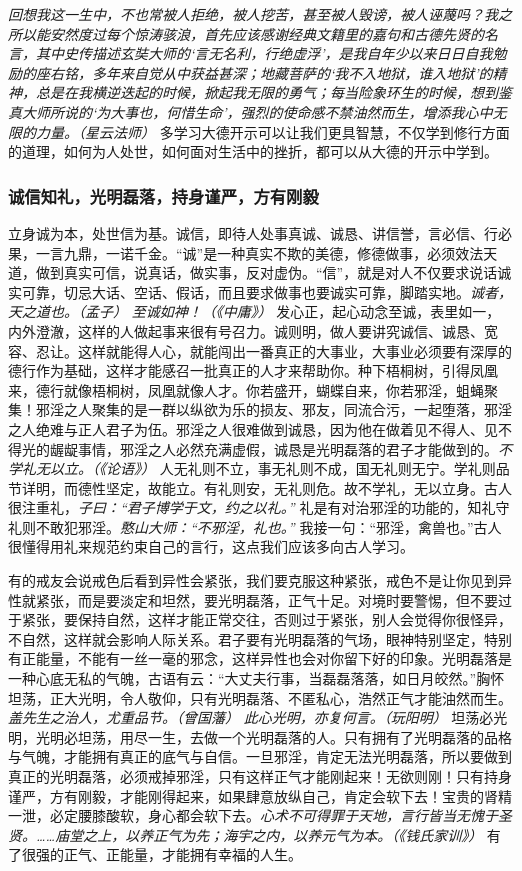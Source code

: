\textit{回想我这一生中，不也常被人拒绝，被人挖苦，甚至被人毁谤，被人诬蔑吗？我之所以能安然度过每个惊涛骇浪，首先应该感谢经典文籍里的嘉句和古德先贤的名言，其中史传描述玄奘大师的‘言无名利，行绝虚浮’，是我自年少以来日日自我勉励的座右铭，多年来自觉从中获益甚深；地藏菩萨的‘我不入地狱，谁入地狱’的精神，总是在我横逆迭起的时候，掀起我无限的勇气；每当险象环生的时候，想到鉴真大师所说的‘为大事也，何惜生命’，强烈的使命感不禁油然而生，增添我心中无限的力量。（星云法师）} 多学习大德开示可以让我们更具智慧，不仅学到修行方面的道理，如何为人处世，如何面对生活中的挫折，都可以从大德的开示中学到。

\subsubsection{诚信知礼，光明磊落，持身谨严，方有刚毅}

立身诚为本，处世信为基。诚信，即待人处事真诚、诚恳、讲信誉，言必信、行必果，一言九鼎，一诺千金。“诚”是一种真实不欺的美德，修德做事，必须效法天道，做到真实可信，说真话，做实事，反对虚伪。“信”，就是对人不仅要求说话诚实可靠，切忌大话、空话、假话，而且要求做事也要诚实可靠，脚踏实地。\textit{诚者，天之道也。（孟子）} \textit{至诚如神！（《中庸》）} 发心正，起心动念至诚，表里如一，内外澄澈，这样的人做起事来很有号召力。诚则明，做人要讲究诚信、诚恳、宽容、忍让。这样就能得人心，就能闯出一番真正的大事业，大事业必须要有深厚的德行作为基础，这样才能感召一批真正的人才来帮助你。种下梧桐树，引得凤凰来，德行就像梧桐树，凤凰就像人才。你若盛开，蝴蝶自来，你若邪淫，蛆蝇聚集！邪淫之人聚集的是一群以纵欲为乐的损友、邪友，同流合污，一起堕落，邪淫之人绝难与正人君子为伍。邪淫之人很难做到诚恳，因为他在做着见不得人、见不得光的龌龊事情，邪淫之人必然充满虚假，诚恳是光明磊落的君子才能做到的。\textit{不学礼无以立。（《论语》）} 人无礼则不立，事无礼则不成，国无礼则无宁。学礼则品节详明，而德性坚定，故能立。有礼则安，无礼则危。故不学礼，无以立身。古人很注重礼，\textit{子曰：“君子博学于文，约之以礼。”} 礼是有对治邪淫的功能的，知礼守礼则不敢犯邪淫。\textit{憨山大师：“不邪淫，礼也。”} 我接一句：“邪淫，禽兽也。”古人很懂得用礼来规范约束自己的言行，这点我们应该多向古人学习。

有的戒友会说戒色后看到异性会紧张，我们要克服这种紧张，戒色不是让你见到异性就紧张，而是要淡定和坦然，要光明磊落，正气十足。对境时要警惕，但不要过于紧张，要保持自然，这样才能正常交往，否则过于紧张，别人会觉得你很怪异，不自然，这样就会影响人际关系。君子要有光明磊落的气场，眼神特别坚定，特别有正能量，不能有一丝一毫的邪念，这样异性也会对你留下好的印象。光明磊落是一种心底无私的气魄，古语有云：“大丈夫行事，当磊磊落落，如日月皎然。”胸怀坦荡，正大光明，令人敬仰，只有光明磊落、不匿私心，浩然正气才能油然而生。\textit{盖先生之治人，尤重品节。（曾国藩）} \textit{此心光明，亦复何言。（玩阳明）} 坦荡必光明，光明必坦荡，用尽一生，去做一个光明磊落的人。只有拥有了光明磊落的品格与气魄，才能拥有真正的底气与自信。一旦邪淫，肯定无法光明磊落，所以要做到真正的光明磊落，必须戒掉邪淫，只有这样正气才能刚起来！无欲则刚！只有持身谨严，方有刚毅，才能刚得起来，如果肆意放纵自己，肯定会软下去！宝贵的肾精一泄，必定腰膝酸软，身心都会软下去。\textit{心术不可得罪于天地，言行皆当无愧于圣贤。……庙堂之上，以养正气为先；海宇之内，以养元气为本。（《钱氏家训》）} 有了很强的正气、正能量，才能拥有幸福的人生。

